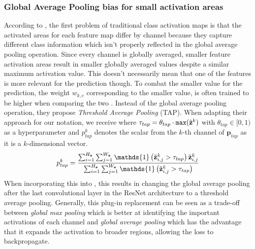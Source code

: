 \subsubsection{Global Average Pooling bias for small activation areas}
According to \citet{Bae2020RethinkingCAM}, the first problem of traditional class activation maps is that the activated areas for each feature map differ by channel because they capture different class information which isn't properly reflected in the global average pooling operation. Since every channel is globally averaged, smaller feature activation areas result in smaller globally averaged values despite a similar maximum activation value. This doesn't necessarily mean that one of the features is more relevant for the prediction though. To combat the smaller value for the prediction, the weight $w_{k,c}$ corresponding to the smaller value, is often trained to be higher when comparing the two \citep{Bae2020RethinkingCAM}. Instead of the global average pooling operation, they propose \emph{Threshold Average Pooling} (TAP). When adapting their approach for our notation, we receive  where $\tau_{t a p} = \theta_{tap} \cdot \mathtt{max}(\Tilde{\mathbf{z}}^k)$ with $\theta_{tap} \in [0,1)$ as a hyperparameter and $p^k_{tap}$ denotes the scalar from the $k$-th channel of $\mathbf{p}_{tap}$ as it is a $k$-dimensional vector. 
\begin{equation}
\label{eq:tap}
p^k_{tap} =\frac{\sum_{i=1}^{H_\mathbf{z}} \sum_{j=1}^{W_\mathbf{z}} \mathds{1}\left(\Tilde{\mathbf{z}}^k_{i,j} > \tau_{t a p}\right) \Tilde{\mathbf{z}}^k_{i,j}}{\sum_{i=1}^{H_\mathbf{z}} \sum_{j=1}^{W_\mathbf{z}} \mathds{1}\left(\Tilde{\mathbf{z}}^k_{i,j} > \tau_{t a p}\right)}
\end{equation}
When incorporating this into \divcam, this results in changing the global average pooling after the last convolutional layer in the ResNet architecture to a threshold average pooling. Generally, this plug-in replacement can be seen as a trade-off between \emph{global max pooling} which is better at identifying the important activations of each channel and \emph{global average pooling} which has the advantage that it expands the activation to broader regions, allowing the loss to backpropagate.

